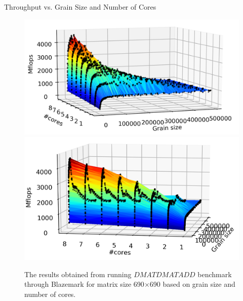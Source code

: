 \documentclass[10pt]{beamer}
\begin{document}
\begin{frame}{Throughput vs. Grain Size and Number of Cores}
	\begin{outline}
		\begin{figure}[H]
			\includegraphics[scale=0.42]{images/fig2.png}					\includegraphics[scale=0.42]{images/fig3.png}
			\caption{The results obtained from running $DMATDMATADD$ benchmark through Blazemark for matrix size 690$\times$690 based on grain size and number of cores.}	
			\label{fig29}
		\end{figure}
	\end{outline}
\end{frame}
\end{document}
